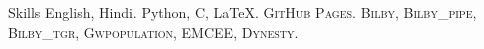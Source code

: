 
\begin{rubric}{Skills}
\entry*[Languages]
	English, Hindi.
	Python, C, \LaTeX.
	\textsc{GitHub Pages}.
\entry*[Packages]
	\textsc{Bilby, Bilby\_pipe, Bilby\_tgr, Gwpopulation, EMCEE, Dynesty}.
    
\end{rubric}
